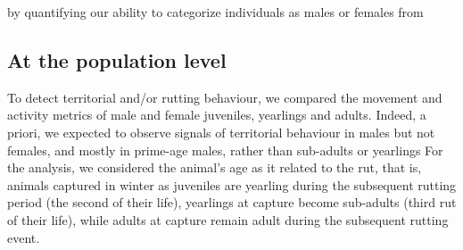\documentclass[a4paper,11pt]{article}
\begin{document}
 by quantifying our ability to categorize individuals as males or females from

\subsection*{At the population level}
To detect territorial and/or rutting behaviour, we compared the
movement and activity metrics of male and female juveniles, yearlings
and adults. Indeed, a priori, we expected to observe signals of
territorial behaviour in males but not females, and mostly in
prime-age males, rather than sub-adults or yearlings For the analysis,
we considered the animal’s age as it related to the rut, that is,
animals captured in winter as juveniles are yearling during the
subsequent rutting period (the second of their life), yearlings at
capture become sub-adults (third rut of their life), while adults at
capture remain adult during the subsequent rutting event.
\end{document}
